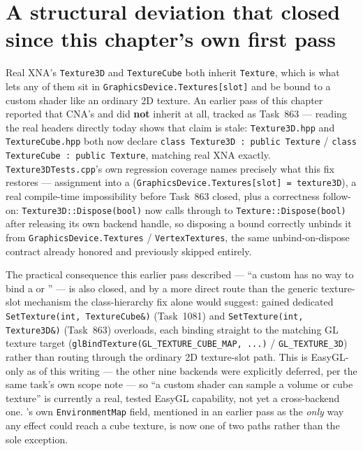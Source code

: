 \section{A structural deviation that closed since this chapter's own first pass}
\label{sec:texture3d-inheritance}

Real XNA's \texttt{Texture3D} and \texttt{TextureCube} both inherit \texttt{Texture}, which
is what lets any of them sit in \texttt{GraphicsDevice.Textures[slot]} and be bound to a
custom shader like an ordinary 2D texture. An earlier pass of this chapter reported that
CNA's  and  did \textbf{not} inherit
 at all, tracked as Task~863 --- reading the real headers directly today
shows that claim is stale: \texttt{Texture3D.hpp} and \texttt{TextureCube.hpp} both now
declare \texttt{class Texture3D : public Texture} / \texttt{class TextureCube : public
Texture}, matching real XNA exactly. \texttt{Texture3DTests.cpp}'s own regression coverage
names precisely what this fix restores --- assignment into a 
(\texttt{GraphicsDevice.Textures[slot] = texture3D}), a real compile-time impossibility
before Task~863 closed, plus a correctness follow-on: \texttt{Texture3D::Dispose(bool)} now
calls through to \texttt{Texture::Dispose(bool)} after releasing its own backend handle, so
disposing a bound  correctly unbinds it from
\texttt{GraphicsDevice.Textures} / \texttt{VertexTextures}, the same unbind-on-dispose contract
 already honored and  previously skipped entirely.

The practical consequence this earlier pass described --- ``a custom
 has no way to bind a  or ''
--- is also closed, and by a more direct route than the generic texture-slot mechanism the
class-hierarchy fix alone would suggest:  gained dedicated
\texttt{SetTexture(int, TextureCube\&)} (Task~1081) and \texttt{SetTexture(int, Texture3D\&)}
(Task~863) overloads, each binding straight to the matching GL texture target
(\texttt{glBindTexture(GL\_TEXTURE\_CUBE\_MAP, ...)} / \texttt{GL\_TEXTURE\_3D}) rather than
routing through the ordinary 2D texture-slot path. This is EasyGL-only as of this writing ---
the other nine backends were explicitly deferred, per the same task's own scope note --- so
``a custom shader can sample a volume or cube texture'' is currently a real, tested EasyGL
capability, not yet a cross-backend one. 's own
\texttt{EnvironmentMap} field, mentioned in an earlier pass as the \emph{only} way any effect
could reach a cube texture, is now one of two paths rather than the sole exception.

